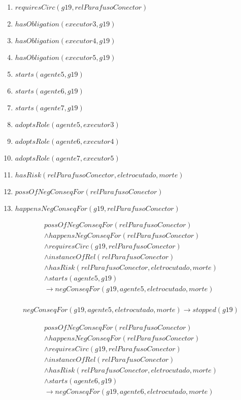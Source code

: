 \begin{enumerate}	
	\item $requiresCirc(g19,relParafusoConector)$		
	\item $hasObligation(executor3,g19)$
	\item $hasObligation(executor4,g19)$
	\item $hasObligation(executor5,g19)$		
	\item $starts(agente5,g19)$
	\item $starts(agente6,g19)$
	\item $starts(agente7,g19)$									
	\item $adoptsRole(agente5,executor3)$
	\item $adoptsRole(agente6,executor4)$
	\item $adoptsRole(agente7,executor5)$
	\item $hasRisk(relParafusoConector,eletrocutado,morte)$
	\item $possOfNegConseqFor(relParafusoConector)$
	\item $happensNegConseqFor(g19,relParafusoConector)$	
\end{enumerate}


\begin{eqnarray}\nonumber
   possOfNegConseqFor(relParafusoConector) \nonumber \\
    \wedge happensNegConseqFor(relParafusoConector) \nonumber \\ 
    \wedge requiresCirc(g19,relParafusoConector) \nonumber \\  
    \wedge instanceOfRel(relParafusoConector) \nonumber \\ 
    \wedge hasRisk(relParafusoConector,eletrocutado,morte) \nonumber \\  
    \wedge starts(agente5,g19) \nonumber \\ 
    \to negConseqFor(g19,agente5,eletrocutado,morte) \\ \nonumber    
\end{eqnarray}

\begin{eqnarray}
	negConseqFor(g19,agente5,eletrocutado,morte) \to stopped(g19)
\end{eqnarray}

\begin{eqnarray}\nonumber
   possOfNegConseqFor(relParafusoConector) \nonumber \\
    \wedge happensNegConseqFor(relParafusoConector) \nonumber \\ 
    \wedge requiresCirc(g19,relParafusoConector) \nonumber \\  
    \wedge instanceOfRel(relParafusoConector) \nonumber \\ 
    \wedge hasRisk(relParafusoConector,eletrocutado,morte) \nonumber \\  
    \wedge starts(agente6,g19) \nonumber \\ 
    \to negConseqFor(g19,agente6,eletrocutado,morte) \\ \nonumber    
\end{eqnarray}

